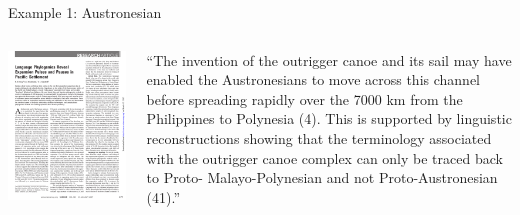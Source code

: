 \documentclass[9pt]{beamer}
\begin{document}
\begin{frame}{Example 1: Austronesian}
  \begin{columns}
    \begin{column}{0.5\textwidth}
      \footnotemark\includegraphics[width=\textwidth,page=2,trim={2cm 4cm 1cm 5cm},clip]{austronesian.pdf}
    \end{column}
    \begin{column}{0.5\textwidth}
      \footnotesize “The invention of the outrigger canoe and its
        sail may have enabled the Austronesians to move across this
        channel before spreading rapidly over the 7000 km from the
        Philippines to Polynesia (4). This is supported by linguistic
        reconstructions showing that the terminology associated with
        the outrigger canoe complex can only be traced back to Proto-
        Malayo-Polynesian and not Proto-Austronesian (41).”

\end{column}
\end{columns}
\end{frame}
\end{document}
